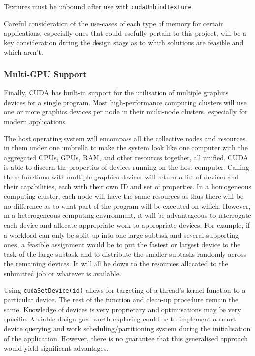 \documentclass[conference]{IEEEtran}
\begin{document}
Textures must be unbound after use with \texttt{cudaUnbindTexture}.

Careful consideration of the use-cases of each type of memory for certain applications, especially ones that could usefully pertain to this project, will be a key consideration during the design stage as to which solutions are feasible and which aren't.


\subsubsection{Multi-GPU Support}

Finally, CUDA has built-in support for the utilisation of multiple graphics devices for a single program. Most high-performance computing clusters will use one or more graphics devices per node in their multi-node clusters, especially for modern applications.

The host operating system will encompass all the collective nodes and resources in them under one umbrella to make the system look like one computer with the aggregated CPUs, GPUs, RAM, and other resources together, all unified. CUDA is able to discern the properties of devices running on the host computer. Calling these functions with multiple graphics devices will return a list of devices and their capabilities, each with their own ID and set of properties. In a homogeneous computing cluster, each node will have the same resources as thus there will be no difference as to what part of the program will be executed on which. However, in a heterogeneous computing environment, it will be advantageous to interrogate each device and allocate appropriate work to appropriate devices. For example, if a workload can only be split up into one large subtask and several supporting ones, a feasible assignment would be to put the fastest or largest device to the task of the large subtask and to distribute the smaller subtasks randomly across the remaining devices. It will all be down to the resources allocated to the submitted job or whatever is available.

Using \texttt{cudaSetDevice(id)} allows for targeting of a thread's kernel function to a particular device. The rest of the function and clean-up procedure remain the same. Knowledge of devices is very proprietary and optimisations may be very specific. A viable design goal worth exploring could be to implement a smart device querying and work scheduling/partitioning system during the initialisation of the application. However, there is no guarantee that this generalised approach would yield significant advantages.
\end{document}
